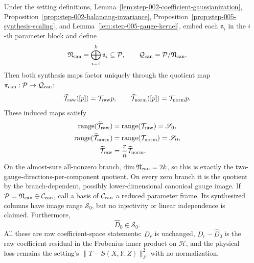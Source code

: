 \begin{proposition}
\label{prop:step-005-quotient-range}
Under the setting definitions, Lemma~\ref{lem:step-002-coefficient-gaussianization}, Proposition~\ref{prop:step-002-balancing-invariance},
Proposition~\ref{prop:step-005-synthesis-scaling}, and
Lemma~\ref{lem:step-005-gauge-kernel}, embed each \(\mathfrak n_i\) in the
\(i\)-th parameter block and define
\[
  \mathfrak N_{\rm can}=\bigoplus_{i=1}^k\mathfrak n_i\subseteq\mathcal P,
  \qquad \mathcal Q_{\rm can}=\mathcal P/\mathfrak N_{\rm can}.
\]
Then both synthesis maps factor uniquely through the quotient map
\(\pi_{\rm can}:\mathcal P\to\mathcal Q_{\rm can}\):
\[
  \widetilde{\mathcal T}_{\rm raw}([p])=\mathcal T_{\rm raw}p,
  \qquad
  \widetilde{\mathcal T}_{\rm norm}([p])=\mathcal T_{\rm norm}p.
\]
These induced maps satisfy
\[
\begin{aligned}
  \operatorname{range}(\widetilde{\mathcal T}_{\rm raw})
  &=\operatorname{range}(\mathcal T_{\rm raw})
   =\mathscr S_0,\\
  \operatorname{range}(\widetilde{\mathcal T}_{\rm norm})
  &=\operatorname{range}(\mathcal T_{\rm norm})
   =\mathscr S_0,\\
  \widetilde{\mathcal T}_{\rm raw}
  &=\frac rn\widetilde{\mathcal T}_{\rm norm}.
\end{aligned}
\]
On the almost-sure all-nonzero branch,
\(\dim\mathfrak N_{\rm can}=2k\), so this is exactly the two-gauge-directions-per-component quotient. On every zero branch it is the
quotient by the branch-dependent, possibly lower-dimensional canonical gauge
image. If
\(\mathcal P=\mathfrak N_{\rm can}\oplus\mathcal C_{\rm can}\), call a basis
of \(\mathcal C_{\rm can}\) a reduced parameter frame. Its synthesized
columns have image range \(\mathscr S_0\), but no injectivity or linear
independence is claimed. Furthermore,
\[
  \boxed{\widehat D_0\in\mathscr S_0}.
\]
All these are raw coefficient-space statements: \(D_r\) is unchanged,
\(D_r-\widehat D_0\) is the raw coefficient residual in the Frobenius inner
product on \(\mathcal H\), and the physical loss remains the setting's
\(\|T-S(X,Y,Z)\|_F^2\) with no normalization.

\end{proposition}

